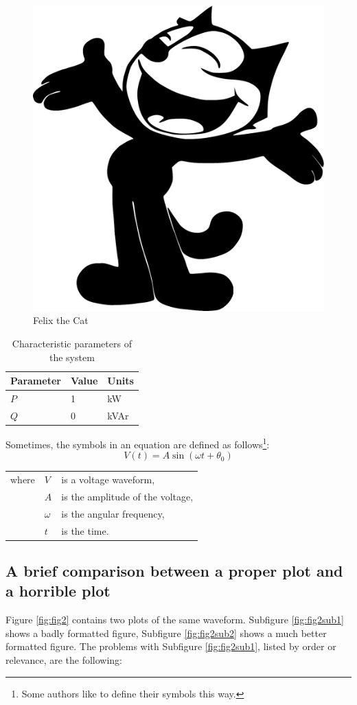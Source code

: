 \begin{figure}[htbp]
\centering
\includegraphics[width=0.3\linewidth]{introduction/fig/Felix_the_cat.pdf}
\caption{Felix the Cat}
\label{fig:felix}
\end{figure}

\begin{table}[htbp]
	\centering
	\begin{tabular}{lll}
		Parameter & Value & Units\\
		\hline
		$P$ & 1 & kW \\
		$Q$ & 0 & kVAr\\
	    \hline
	\end{tabular}
	\caption{Characteristic parameters of the system}
	\label{tab:tab1}
\end{table}

\begin{samepage}
Sometimes, the symbols in an equation are defined as follows\footnote{Some authors like to define their symbols this way.}:
\begin{equation}
	V(t)=A \sin(\omega t+\theta_0)
\end{equation}
\begin{tabular}{lll}
	where & $V$ & is a voltage waveform,\\
	& $A$ & is the amplitude of the voltage,\\
	& $\omega$ & is the angular frequency,\\
	& $t$ & is the time.
\end{tabular}
\end{samepage}

\subsection{A brief comparison between a proper plot and a horrible plot}

Figure \ref{fig:fig2} contains two plots of the same waveform. Subfigure \ref{fig:fig2sub1} shows a badly formatted figure, Subfigure \ref{fig:fig2sub2} shows a much better formatted figure. The problems with Subfigure \ref{fig:fig2sub1}, listed by order or relevance, are the following:

